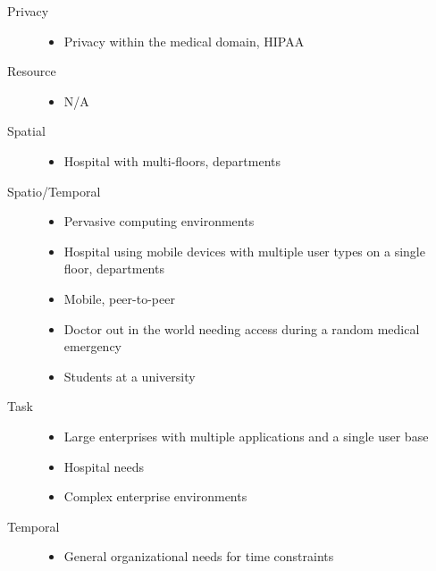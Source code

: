 \documentclass[letterpaper,10pt,english]{sphinxmanual}
\begin{document}
\begin{description}
\begin{itemize}
\end{itemize}

\item[{Privacy}] \leavevmode\begin{itemize}
\item {} 
Privacy within the medical domain, HIPAA

\end{itemize}

\item[{Resource}] \leavevmode\begin{itemize}
\item {} 
N/A

\end{itemize}

\item[{Spatial}] \leavevmode\begin{itemize}
\item {} 
Hospital with multi-floors, departments

\end{itemize}

\item[{Spatio/Temporal}] \leavevmode\begin{itemize}
\item {} 
Pervasive computing environments

\item {} 
Hospital using mobile devices with multiple user types on a single floor, departments

\item {} 
Mobile, peer-to-peer

\item {} 
Doctor out in the world needing access during a random medical emergency

\item {} 
Students at a university

\end{itemize}

\item[{Task}] \leavevmode\begin{itemize}
\item {} 
Large enterprises with multiple applications and a single user base

\item {} 
Hospital needs

\item {} 
Complex enterprise environments

\end{itemize}

\item[{Temporal}] \leavevmode\begin{itemize}
\item {} 
General organizational needs for time constraints

\end{itemize}

\end{description}
\end{document}

